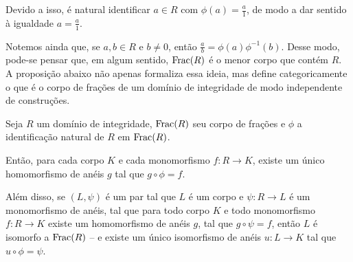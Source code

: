 Devido a isso, é natural identificar $a \in R$ com $\phi(a)=\frac{a}{1}$, de modo a dar sentido à igualdade $a=\frac{a}{1}$.

Notemos ainda que, se $a, b\in R$ e $b\neq 0$, então $\frac{a}{b}=\phi(a)\phi^{-1}(b)$.
Desse modo, pode-se pensar que, em algum sentido, $\operatorname{Frac}(R)$ é o menor corpo que contém $R$.
A proposição abaixo não apenas formaliza essa ideia, mas define categoricamente o que é o corpo de frações de um domínio de integridade de modo independente de construções.

\begin{theorem}
    Seja $R$ um domínio de integridade, $\operatorname{Frac}(R)$ seu corpo de frações e $\phi$ a identificação natural de $R$ em $\operatorname{Frac}(R)$.

    Então, para cada corpo $K$ e cada monomorfismo $f:R\rightarrow K$, existe um único homomorfismo de anéis $g$ tal que $g\circ\phi=f$.

    Além disso, se $(L, \psi)$ é um par tal que $L$ é um corpo e $\psi:R\rightarrow L$ é um monomorfismo de anéis, tal que para todo corpo $K$ e todo monomorfismo $f:R\rightarrow K$ existe um homomorfismo de anéis $g$, tal que $g\circ\psi=f$, então $L$ é isomorfo a $\operatorname{Frac}(R)$ -- e existe um único isomorfismo de anéis $u:L\rightarrow K$ tal que $u\circ\phi=\psi$.
\end{theorem}

